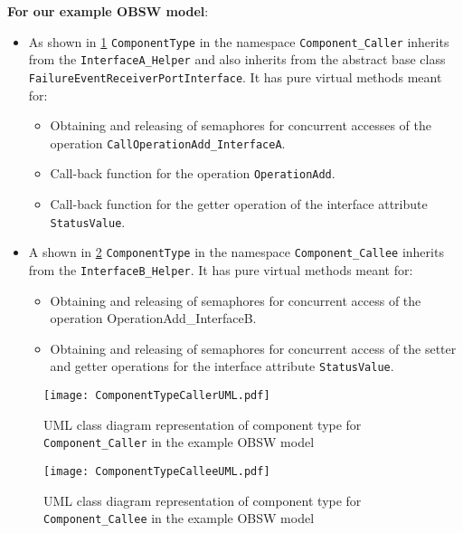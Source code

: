 \textbf{For our example OBSW model}:
\begin{itemize}
\item As shown in \cref{fig: Component type Caller UML} \texttt{ComponentType} in the namespace \texttt{Component\_Caller} inherits from the \texttt{InterfaceA\allowbreak\_Helper} and also inherits from the abstract base class \texttt{FailureEvent\allowbreak ReceiverPort\allowbreak Interface}. 
It has pure virtual methods meant for:

\begin{itemize}
\item Obtaining and releasing of semaphores for concurrent accesses of the operation \texttt{CallOperationAdd\allowbreak\_InterfaceA}.
\item Call-back function for the operation \texttt{OperationAdd}.
\item Call-back function for the getter operation of the interface attribute \texttt{StatusValue}.
\end{itemize}

\item A shown in \cref{fig: Component type Callee UML} \texttt{ComponentType} in the namespace \texttt{Component\_Callee} inherits from the \texttt{InterfaceB\allowbreak\_Helper}. 
It has pure virtual methods meant for:

\begin{itemize}
\item Obtaining and releasing of semaphores for concurrent access of the operation {OperationAdd\allowbreak\_InterfaceB}.
\item Obtaining and releasing of semaphores for concurrent access of the setter and getter operations for the interface attribute \texttt{StatusValue}.
\end{itemize}   
\end{itemize}

\begin{figure}[h]
	\centering
	\texttt{[image: ComponentTypeCallerUML.pdf]}
	\caption{UML class diagram representation of component type for \texttt{Component\allowbreak\_Caller} in the example OBSW model}
	\label{fig: Component type Caller UML}
\end{figure} 

\begin{figure}[h]
	\centering
	\texttt{[image: ComponentTypeCalleeUML.pdf]}
	\caption{UML class diagram representation of component type for \texttt{Component\allowbreak\_Callee} in the example OBSW model}
	\label{fig: Component type Callee UML}
\end{figure} 

